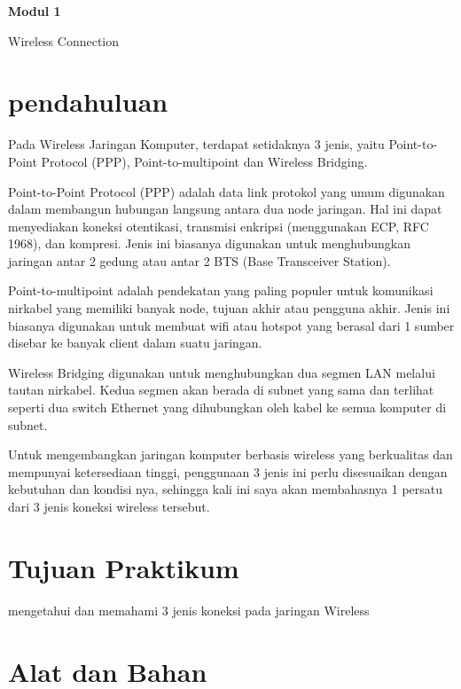 \newpage
\setcounter{section}{0}
\renewcommand{\thesection}{\arabic{section}}

\begin{center}
    \Huge
    \textbf{Modul 1}
    
    Wireless Connection

\end{center}

\section{pendahuluan}

Pada Wireless Jaringan Komputer, terdapat setidaknya 3 jenis, yaitu Point-to-Point Protocol
(PPP), Point-to-multipoint dan Wireless Bridging.

Point-to-Point Protocol (PPP) adalah data link protokol yang umum digunakan dalam
membangun hubungan langsung antara dua node jaringan. Hal ini dapat menyediakan koneksi
otentikasi, transmisi enkripsi (menggunakan ECP, RFC 1968), dan kompresi. Jenis ini
biasanya digunakan untuk menghubungkan jaringan antar 2 gedung atau antar 2 BTS (Base
Transceiver Station).

Point-to-multipoint adalah pendekatan yang paling populer untuk komunikasi nirkabel yang
memiliki banyak node, tujuan akhir atau pengguna akhir. Jenis ini biasanya digunakan untuk
membuat wifi atau hotspot yang berasal dari 1 sumber disebar ke banyak client dalam suatu
jaringan.

Wireless Bridging digunakan untuk menghubungkan dua segmen LAN melalui tautan
nirkabel. Kedua segmen akan berada di subnet yang sama dan terlihat seperti dua switch
Ethernet yang dihubungkan oleh kabel ke semua komputer di subnet.

Untuk mengembangkan jaringan komputer berbasis wireless yang berkualitas dan mempunyai
ketersediaan tinggi, penggunaan 3 jenis ini perlu disesuaikan dengan kebutuhan dan kondisi
nya, sehingga kali ini saya akan membahasnya 1 persatu dari 3 jenis koneksi wireless
tersebut.

\section{Tujuan Praktikum}

mengetahui dan memahami 3 jenis koneksi pada jaringan Wireless

\section{Alat dan Bahan}

